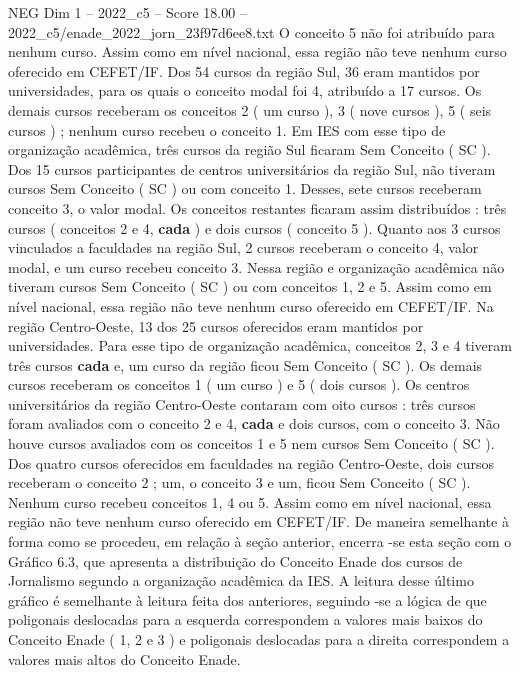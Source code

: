\begin{textsample}{NEG Dim 1 – 2022\_c5 – Score 18.00 – 2022\_c5/enade\_2022\_jorn\_23f97d6ee8.txt}
O conceito 5 não foi atribuído para nenhum curso.
Assim como em nível nacional, essa região não teve nenhum curso oferecido em CEFET/IF.
Dos 54 cursos da região Sul, 36 eram mantidos por universidades, para os quais o conceito modal foi 4, atribuído a 17 cursos.
Os demais cursos receberam os conceitos 2 ( um curso ), 3 ( nove cursos ), 5 ( seis cursos ) ; nenhum curso recebeu o conceito 1.
Em IES com esse tipo de organização acadêmica, três cursos da região Sul ficaram Sem Conceito ( SC ).
Dos 15 cursos participantes de centros universitários da região Sul, não tiveram cursos Sem Conceito ( SC ) ou com conceito 1.
Desses, sete cursos receberam conceito 3, o valor modal.
Os conceitos restantes ficaram assim distribuídos : três cursos ( conceitos 2 e 4, \textbf{cada} ) e dois cursos ( conceito 5 ).
Quanto aos 3 cursos vinculados a faculdades na região Sul, 2 cursos receberam o conceito 4, valor modal, e um curso recebeu conceito 3.
Nessa região e organização acadêmica não tiveram cursos Sem Conceito ( SC ) ou com conceitos 1, 2 e 5.
Assim como em nível nacional, essa região não teve nenhum curso oferecido em CEFET/IF.
Na região Centro-Oeste, 13 dos 25 cursos oferecidos eram mantidos por universidades.
Para esse tipo de organização acadêmica, conceitos 2, 3 e 4 tiveram três cursos \textbf{cada} e, um curso da região ficou Sem Conceito ( SC ).
Os demais cursos receberam os conceitos 1 ( um curso ) e 5 ( dois cursos ).
Os centros universitários da região Centro-Oeste contaram com oito cursos : três cursos foram avaliados com o conceito 2 e 4, \textbf{cada} e dois cursos, com o conceito 3.
Não houve cursos avaliados com os conceitos 1 e 5 nem cursos Sem Conceito ( SC ).
Dos quatro cursos oferecidos em faculdades na região Centro-Oeste, dois cursos receberam o conceito 2 ; um, o conceito 3 e um, ficou Sem Conceito ( SC ).
Nenhum curso recebeu conceitos 1, 4 ou 5.
Assim como em nível nacional, essa região não teve nenhum curso oferecido em CEFET/IF.
De maneira semelhante à forma como se procedeu, em relação à seção anterior, encerra -se esta seção com o Gráfico 6.3, que apresenta a distribuição do Conceito Enade dos cursos de Jornalismo segundo a organização acadêmica da IES.
A leitura desse último gráfico é semelhante à leitura feita dos anteriores, seguindo -se a lógica de que poligonais deslocadas para a esquerda correspondem a valores mais baixos do Conceito Enade ( 1, 2 e 3 ) e poligonais deslocadas para a direita correspondem a valores mais altos do Conceito Enade.

\end{textsample}
